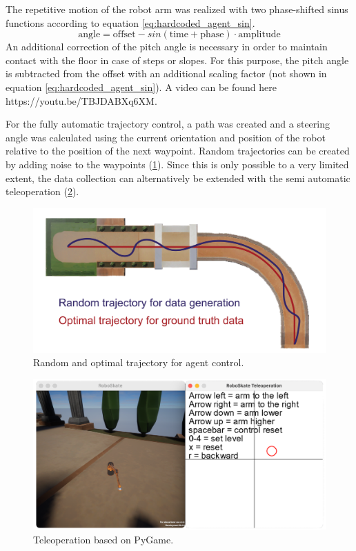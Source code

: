 \documentclass[conference]{IEEEtran}
\begin{document}
The repetitive motion of the robot arm was realized with two phase-shifted sinus functions according to equation \ref{eq:hardcoded_agent_sin}. 
\begin{equation}  \label{eq:hardcoded_agent_sin}
    \text{angle} = \text{offset} - sin(\text{time} + \text{phase}) \cdot \text{amplitude}
\end{equation}
An additional correction of the pitch angle is necessary in order to maintain contact with the floor in case of steps or slopes. For this purpose, the pitch angle is subtracted from the offset with an additional scaling factor (not shown in equation \ref{eq:hardcoded_agent_sin}). A video can be found here https://youtu.be/TBJDABXq6XM.

For the fully automatic trajectory control, a path was created and a steering angle was calculated using the current orientation and position of the robot relative to the position of the next waypoint. Random trajectories can be created by adding noise to the waypoints (\figurename  \ref{fig:Trajectory_agent_control}). Since this is only possible to a very limited extent, the data collection can alternatively be extended with the semi automatic teleoperation (\figurename  \ref{fig:Teleoperation}).

\begin{figure}[!t]
  \centering
  \includegraphics[width=0.8\linewidth]{images/Trajectory-01.png}
  \caption{Random and optimal trajectory for agent control.}
\label{fig:Trajectory_agent_control}
\end{figure}


\begin{figure}[!t]
  \centering
  \includegraphics[width=0.8\linewidth]{images/Teleoperation.png}
  \caption{Teleoperation based on PyGame.}
\label{fig:Teleoperation}
\end{figure}
\end{document}
